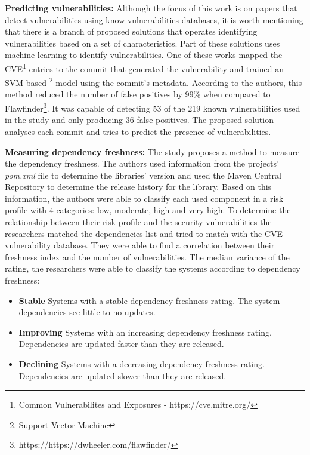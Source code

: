 \documentclass[pdf,bookmarks,colorlinks=true]{IEEEtran}
\begin{document}
\textbf{Predicting vulnerabilities:}
Although the focus of this work is on papers that detect vulnerabilities using know vulnerabilities databases, it is worth mentioning that there is a branch of proposed solutions that operates identifying vulnerabilities based on a set of characteristics. Part of these solutions uses machine learning to identify vulnerabilities. One of these works \cite{Perl2015} mapped the CVE\footnote{Common Vulnerabilites and Exposures - https://cve.mitre.org/} entries to the commit that generated the vulnerability and trained an SVM-based \footnote{Support Vector Machine} model using the commit's metadata. According to the authors, this method reduced the number of false positives by 99\% when compared to Flawfinder\footnote{https://https://dwheeler.com/flawfinder/}. It was capable of detecting 53 of the 219 known vulnerabilities used in the study and only producing 36 false positives. The proposed solution analyses each commit and tries to predict the presence of vulnerabilities.

\textbf{Measuring dependency freshness:}
The study \cite{Cox2015} proposes a method to measure the dependency freshness. The authors used information from the projects' {\em pom.xml} file to determine the libraries' version and used the Maven Central Repository to determine the release history for the library. Based on this information, the authors were able to classify each used component in a risk profile with 4 categories: low, moderate, high and very high.
To determine the relationship between their risk profile and the security vulnerabilities the researchers matched the dependencies list and tried to match with the CVE vulnerability database. They were able to find a correlation between their freshness index and the number of vulnerabilities. The median variance of the rating, the researchers were able to classify the systems according to dependency freshness:
\begin{itemize}
	\item \textbf{Stable} Systems with a stable dependency freshness rating. The system dependencies see little to no updates.
	\item \textbf{Improving} Systems with an increasing dependency freshness
	rating. Dependencies are updated faster than they are released.
	\item \textbf{Declining} Systems with a decreasing dependency freshness
	rating. Dependencies are updated slower than they are released.
\end{itemize}
\end{document}
